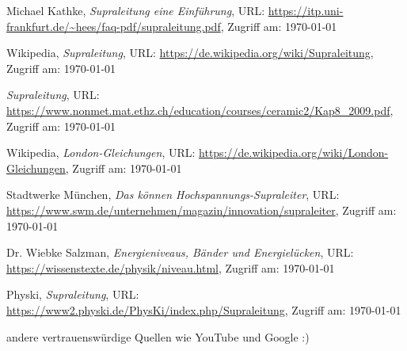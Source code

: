 \begin{thebibliography}{9}


Michael Kathke, \textit{Supraleitung eine Einführung}, URL: \url{https://itp.uni-frankfurt.de/~hees/faq-pdf/supraleitung.pdf}, Zugriff am: \today

Wikipedia, \textit{Supraleitung}, URL: \url{https://de.wikipedia.org/wiki/Supraleitung}, Zugriff am: \today

\textit{Supraleitung}, URL: \url{https://www.nonmet.mat.ethz.ch/education/courses/ceramic2/Kap8_2009.pdf}, Zugriff am: \today

Wikipedia, \textit{London-Gleichungen}, URL: \url{https://de.wikipedia.org/wiki/London-Gleichungen}, Zugriff am: \today

Stadtwerke München, \textit{Das können Hochspannungs-Supraleiter}, URL: \url{https://www.swm.de/unternehmen/magazin/innovation/supraleiter}, Zugriff am: \today

Dr. Wiebke Salzman, \textit{Energieniveaus, Bänder und Energielücken}, URL: \url{https://wissenstexte.de/physik/niveau.html}, Zugriff am: \today

Physki, \textit{Supraleitung}, URL: \url{https://www2.physki.de/PhysKi/index.php/Supraleitung}, Zugriff am: \today

andere vertrauenswürdige Quellen wie YouTube und Google :)
\end{thebibliography}